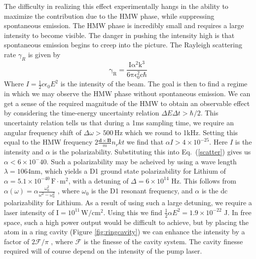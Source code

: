 \documentclass[twocolumn,english,pra,aps,superscriptaddress,floatfix]{revtex4-1}
\begin{document}
The difficulty in realizing this effect experimentally hangs in the ability to maximize the contribution due to the HMW phase, while suppressing spontaneous emission. The HMW phase is incredibly small and requires a large intensity to become visible. The danger in pushing the intensity high is that spontaneous emission begins to creep into the picture. The Rayleigh scattering rate $\gamma_{R}$
is given by
\begin{equation}
\mathrm{\gamma_{R}=\frac{I\alpha ^2 k^3}{6 \pi\epsilon_{0}^2 c\hbar}}
\label{scatter}
\end{equation}
Where $I=\frac{1}{2}c\epsilon_0 E^2$ is the intensity of the beam. The goal is then to find a regime in which we may observe the HMW phase without spontaneous emission. We can get a sense of the required magnitude of the HMW to obtain an observable effect by considering the time-energy uncertainty relation $\Delta E \Delta t>\hbar/2$.  This uncertainty relation tells us that during a 1ms sampling time, we require an angular frequency shift of $\Delta \omega>500\,\mathrm{Hz}$ which we round to 1kHz. Setting this equal to the HMW frequency $2\frac{\mathbf{d}\times\mathbf{B}}{m}n_rkt$ we find that $\alpha I>4\times 10^{-25}$. Here $I$ is the intensity and $\alpha$ is the polarizability. Substituting this into Eq.\ (\ref{scatter}) gives us $\alpha<6\times10^-40$.  Such a polarizability may be acheived by using a wave length $\lambda=1064$nm, which yields a D1 ground state polarizability for Lithium of $\alpha =5.1\times 10^{-40} \,\mathrm{F\cdot m^2}$, with a detuning of $\Delta=6\times10^{14}$ Hz. This follows from $\alpha(\omega)=\alpha\frac{\omega_0^2}{\omega^2-\omega_0^2}$ \cite{steck}, where $\omega_0$ is the D1 resonant frequency, and $\alpha$ is the dc polarizability for Lithium.  As a result of using such a large detuning, we require a laser intensity of $\mathrm{I=10^{11}\,W/cm^2}$. Using this we find $\frac{1}{2}\alpha E^2=1.9\times 10^{-22}$ J. In free space, such a high power output would be difficult to achieve, but by placing the atom in a ring cavity (Figure \ref{fig:ringcavity}) we can enhance the intensity by a factor of $2\mathcal{F}/\pi$ \cite{spectroscopy}, where $\mathcal{F}$ is the finesse of the cavity system.  The cavity finesse required will of course depend on the intensity of the pump laser.
\end{document}
